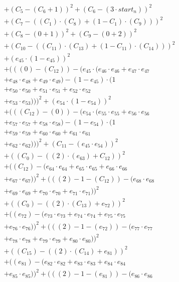 \documentclass[10pt, a4paper]{article}
\begin{document}
\begin{align*}
& + (C_{5} - (C_{6} + 1))^{2} + (C_{6} - (3  \cdot  start_n))^{2} \\
& + (C_{7} - ((C_{1})  \cdot  (C_{8}) + (1 - C_{1})  \cdot  (C_{9})))^{2} \\
& + (C_{8} - (0 + 1))^{2} + (C_{9} - (0 + 2))^{2} \\
& + (C_{10} - ((C_{11})  \cdot  (C_{13}) + (1 - C_{11})  \cdot  (C_{14})))^{2} \\
& + (e_{45} \cdot (1 - e_{45}))^{2} \\
& + (((0) - (C_{12})) - (e_{45} \cdot (e_{46} \cdot e_{46} + e_{47} \cdot e_{47} \\
& + e_{48} \cdot e_{48} + e_{49} \cdot e_{49}) - (1 - e_{45}) \cdot (1 \\
& + e_{50} \cdot e_{50} + e_{51} \cdot e_{51} + e_{52} \cdot e_{52} \\
& + e_{53} \cdot e_{53})))^{2} + (e_{54} \cdot (1 - e_{54}))^{2} \\
& + (((C_{12}) - (0)) - (e_{54} \cdot (e_{55} \cdot e_{55} + e_{56} \cdot e_{56} \\
& + e_{57} \cdot e_{57} + e_{58} \cdot e_{58}) - (1 - e_{54}) \cdot (1 \\
& + e_{59} \cdot e_{59} + e_{60} \cdot e_{60} + e_{61} \cdot e_{61} \\
& + e_{62} \cdot e_{62})))^{2} + (C_{11} - (e_{45} \cdot e_{54}))^{2} \\
& + ((C_{0}) - ((2)  \cdot  (e_{63}) + C_{12}))^{2} \\
& + ((C_{12}) - (e_{64} \cdot e_{64} + e_{65} \cdot e_{65} + e_{66} \cdot e_{66} \\
& + e_{67} \cdot e_{67}))^{2} + (((2) - 1 - (C_{12})) - (e_{68} \cdot e_{68} \\
& + e_{69} \cdot e_{69} + e_{70} \cdot e_{70} + e_{71} \cdot e_{71}))^{2} \\
& + ((C_{0}) - ((2)  \cdot  (C_{13}) + e_{72}))^{2} \\
& + ((e_{72}) - (e_{73} \cdot e_{73} + e_{74} \cdot e_{74} + e_{75} \cdot e_{75} \\
& + e_{76} \cdot e_{76}))^{2} + (((2) - 1 - (e_{72})) - (e_{77} \cdot e_{77} \\
& + e_{78} \cdot e_{78} + e_{79} \cdot e_{79} + e_{80} \cdot e_{80}))^{2} \\
& + ((C_{15}) - ((2)  \cdot  (C_{14}) + e_{81}))^{2} \\
& + ((e_{81}) - (e_{82} \cdot e_{82} + e_{83} \cdot e_{83} + e_{84} \cdot e_{84} \\
& + e_{85} \cdot e_{85}))^{2} + (((2) - 1 - (e_{81})) - (e_{86} \cdot e_{86} \\

\end{align*}
\end{document}
